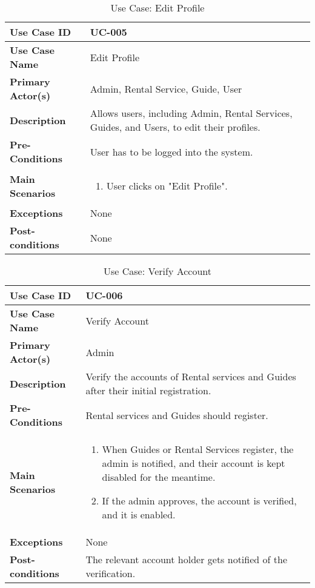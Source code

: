 \begin{table}[ht]
    \centering
    \begin{tabular}{|l|p{}|}
        \hline
        \textbf{Use Case ID} & UC-005 \\
        \hline
        \textbf{Use Case Name} & Edit Profile \\
        \hline
        \textbf{Primary Actor(s)} & Admin, Rental Service, Guide, User \\
        \hline
        \textbf{Description} & Allows users, including Admin, Rental Services, Guides, and Users, to edit their profiles. \\
        \hline
        \textbf{Pre-Conditions} & User has to be logged into the system. \\
        \hline
        \textbf{Main Scenarios} & 
        \begin{enumerate}[label=\arabic*.,itemsep=0pt]
            \item User clicks on "Edit Profile".
        \end{enumerate} \\
        \hline
        \textbf{Exceptions} & None \\
        \hline
        \textbf{Post-conditions} & None \\
        \hline
    \end{tabular}
    \label{tab:use-case-edit-profile}
    \caption{Use Case: Edit Profile}
\end{table}


\begin{table}[ht]
    \centering
    \begin{tabular}{|l|p{}|}
        \hline
        \textbf{Use Case ID} & UC-006 \\
        \hline
        \textbf{Use Case Name} & Verify Account \\
        \hline
        \textbf{Primary Actor(s)} & Admin \\
        \hline
        \textbf{Description} & Verify the accounts of Rental services and Guides after their initial registration. \\
        \hline
        \textbf{Pre-Conditions} & Rental services and Guides should register. \\
        \hline
        \textbf{Main Scenarios} & 
        \begin{enumerate}[label=\arabic*.,itemsep=0pt]
            \item When Guides or Rental Services register, the admin is notified, and their account is kept disabled for the meantime.
            \item If the admin approves, the account is verified, and it is enabled.
        \end{enumerate} \\
        \hline
        \textbf{Exceptions} & None \\
        \hline
        \textbf{Post-conditions} & The relevant account holder gets notified of the verification. \\
        \hline
    \end{tabular}
    \label{tab:use-case-verify-account}
    \caption{Use Case: Verify Account}
\end{table}

